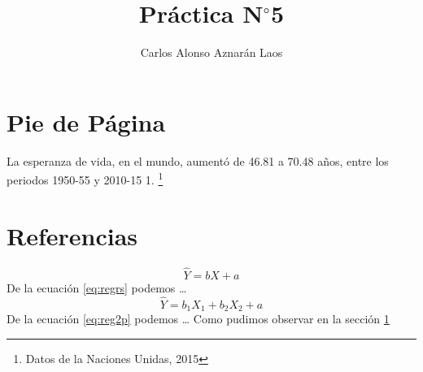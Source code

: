 \documentclass[12pt,a4paper]{article}
\author{Carlos Alonso Aznarán Laos}
\title{Práctica N$^{\circ}$5}
\begin{document}
\maketitle
\section{Pie de Página} \label{sec:pie}
La esperanza de vida, en el mundo, aumentó de 46.81 a 70.48 años, entre los periodos 1950-55 y 2010-15 1.
\footnote{Datos de la Naciones Unidas, 2015 }
\section{Referencias}
\begin{equation}
\hat{Y}=bX+a \label{eq:regrs}
\end{equation}
De la ecuación \ref{eq:regrs} podemos
\ldots
\begin{equation}
\boxed{ \hat{Y}=b_{1} X_{1} + b_{2} X_{2} +a} \label{eq:reg2p}
\end{equation}
De la ecuación \eqref{eq:reg2p} podemos 
\cite{MR3277186}
\cite{MR3366417}
\cite{fernandez2016poligono}
\ldots
Como pudimos observar en la sección \ref{sec:pie}


\end{document}
